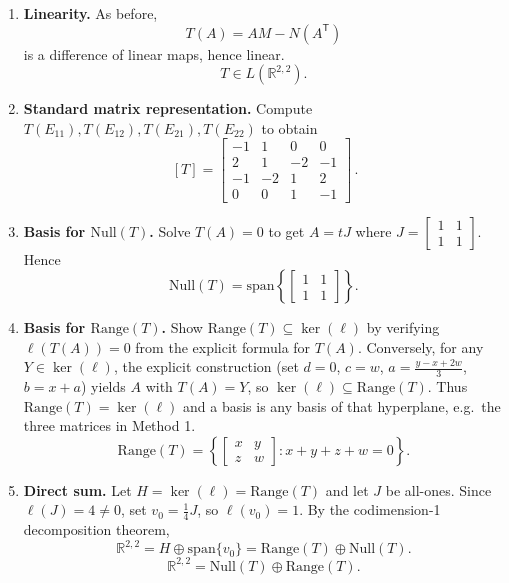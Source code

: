 \documentclass[12pt]{article}
\newcommand{\R}{\mathbb{R}}
\begin{document}
\medskip
\begin{enumerate}[label=(\alph*)]
\item \textbf{Linearity.}
As before,
\[
T(A)=AM-N(A^{\mathsf T})
\]
is a difference of linear maps, hence linear.
\[
\boxed{\,T\in L(\R^{2,2}).\,}
\]

\item \textbf{Standard matrix representation.}
Compute $T(E_{11}),T(E_{12}),T(E_{21}),T(E_{22})$ to obtain
\[
\boxed{\, [T]=
\begin{bmatrix}
-1&1&0&0\\
2&1&-2&-1\\
-1&-2&1&2\\
0&0&1&-1
\end{bmatrix}\,}.
\]

\item \textbf{Basis for $\mathrm{Null}(T)$.}
Solve $T(A)=0$ to get $A=tJ$ where $J=\begin{bmatrix}1&1\\1&1\end{bmatrix}$. Hence
\[
\boxed{\,\mathrm{Null}(T)=\mathrm{span}\left\{\begin{bmatrix}1&1\\1&1\end{bmatrix}\right\}.\,}
\]

\item \textbf{Basis for $\mathrm{Range}(T)$.}
Show $\mathrm{Range}(T)\subseteq \ker(\ell)$ by verifying $\ell(T(A))=0$ from the explicit formula for $T(A)$.
Conversely, for any $Y\in\ker(\ell)$, the explicit construction (set $d=0$, $c=w$, $a=\frac{y-x+2w}{3}$, $b=x+a$) yields $A$ with $T(A)=Y$, so $\ker(\ell)\subseteq\mathrm{Range}(T)$.
Thus $\mathrm{Range}(T)=\ker(\ell)$ and a basis is any basis of that hyperplane, e.g.\ the three matrices in Method 1.
\[
\boxed{\,\mathrm{Range}(T)=\left\{\begin{bmatrix}x&y\\z&w\end{bmatrix}:x+y+z+w=0\right\}.\,}
\]

\item \textbf{Direct sum.}
Let $H=\ker(\ell)=\mathrm{Range}(T)$ and let $J$ be all-ones. Since $\ell(J)=4\neq 0$, set $v_0=\frac14 J$, so $\ell(v_0)=1$.
By the codimension-1 decomposition theorem,
\[
\R^{2,2}=H\oplus \mathrm{span}\{v_0\}=\mathrm{Range}(T)\oplus \mathrm{Null}(T).
\]
\[
\boxed{\,\R^{2,2}=\mathrm{Null}(T)\oplus \mathrm{Range}(T).\,}
\]
\end{enumerate}

\newpage
\end{document}
